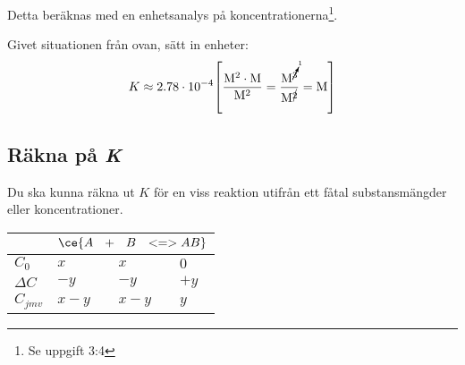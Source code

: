 Detta beräknas med en enhetsanalys på koncentrationerna\footnote{Se uppgift 3:4}.

\begin{exm}
    Givet situationen från ovan, sätt in enheter:
    \begin{equation*}
        K \approx 2.78 \cdot 10^{-4} \mathrm{ \left[\frac{M^2 \cdot M}{M^2} = \frac{M^{\cancelto{1}{3}}}{M^{\cancel{2}}} = M\right]}
    \end{equation*}
\end{exm}

\subsection{Räkna på \textit{K}}

Du ska kunna räkna ut $K$ för en viss reaktion utifrån ett fåtal substansmängder eller koncentrationer.

\begin{exm}
    \begin{table}[H]
        \centering
        \begin{tabular}{|l|l|l|l|} 
        \cline{2-4}
        \multicolumn{1}{l|}{} & \multicolumn{3}{l|}{$\ce{A \hspace{7pt} + \hspace{7pt} B \hspace{7pt} <=> AB}$}  \\ 
        \hline
        $C_0$                 & $x$   & $x$   & $0$                       \\ 
        \hline
        $\Delta C$            & $-y$  & $-y$  & $+y$                      \\ 
        \hline
        $C_{jmv}$             & $x-y$ & $x-y$ & $y$                       \\
        \hline
        \end{tabular}
    \end{table}
\end{exm}